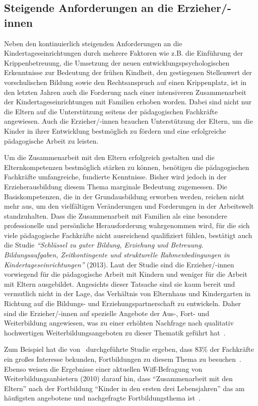 \documentclass[12pt,a4paper]{article}
\begin{document}
\subsection{Steigende Anforderungen an die Erzieher/-innen}
Neben den kontinuierlich steigenden Anforderungen an die Kindertageseinrichtungen durch mehrere Faktoren wie z.B. die Einführung der Krippenbetreuung, die Umsetzung der neuen entwicklungspsychologischen Erkenntnisse zur Bedeutung der frühen Kindheit, den gestiegenen Stellenwert der vorschulischen Bildung sowie den Rechtsanspruch auf einen Krippenplatz, ist in den letzten Jahren auch die Forderung nach einer intensiveren Zusammenarbeit der Kindertageseinrichtungen mit Familien erhoben worden. Dabei sind nicht nur die Eltern auf die Unterstützung seitens der pädagogischen Fachkräfte angewiesen. Auch die Erzieher/-innen brauchen Unterstützung der Eltern, um die Kinder in ihrer Entwicklung bestmöglich zu fördern und eine erfolgreiche pädagogische Arbeit zu leisten.

Um die Zusammenarbeit mit den Eltern erfolgreich gestalten und die Elternkompetenzen bestmöglich stärken zu können, benötigen die pädagogischen Fachkräfte umfangreiche, fundierte Kenntnisse. Bisher wird jedoch in der Erzieherausbildung diesem Thema marginale Bedeutung zugemessen. Die Basiskompetenzen, die in der Grundausbildung erworben werden, reichen nicht mehr aus, um den vielfältigen Veränderungen und Forderungen in der Arbeitswelt standzuhalten. Dass die Zusammenarbeit mit Familien als eine besondere professionelle und persönliche Herausforderung wahrgenommen wird, für die sich viele pädagogische Fachkräfte nicht ausreichend qualifiziert fühlen, bestätigt auch die Studie \textit{"`Schlüssel zu guter Bildung, Erziehung und Betreuung. Bildungsaufgaben, Zeitkontingente und strukturelle Rahmenbedingungen in Kindertageseinrichtungen"'} (2013). Laut der Studie sind die Erzieher/-innen vorwiegend für die pädagogische Arbeit mit Kindern und weniger für die Arbeit mit Eltern ausgebildet. Angesichts dieser Tatsache sind sie kaum bereit und vermutlich nicht in der Lage, das Verhältnis von Elternhaus und Kindergarten in Richtung auf die Bildungs- und Erziehungspartnerschaft zu entwickeln. Daher sind die Erzieher/-innen auf spezielle Angebote der Aus-, Fort- und Weiterbildung angewiesen, was zu einer erhöhten Nachfrage nach qualitativ hochwertigen Weiterbildungsangeboten zu dieser Thematik geführt hat~\parencite[S.~149]{Viernickel_2013}.

Zum Beispiel hat die von~\textcite{Dippelhofer_1995} durchgeführte Studie ergeben, dass 83\% der Fachkräfte ein großes Interesse bekunden, Fortbildungen zu diesem Thema zu besuchen~\parencite[S.~121]{Dippelhofer_1995}. Ebenso weisen die Ergebnisse einer aktuellen Wiff-Befragung von Weiterbildungsanbietern (2010) darauf hin, dass "`Zusammenarbeit mit den Eltern"' nach der Fortbildung "`Kinder in den ersten drei Lebensjahren"' das am häufigsten angebotene und nachgefragte Fortbildungsthema ist~\parencite[S.~17, 23]{Beher}.
\end{document}
